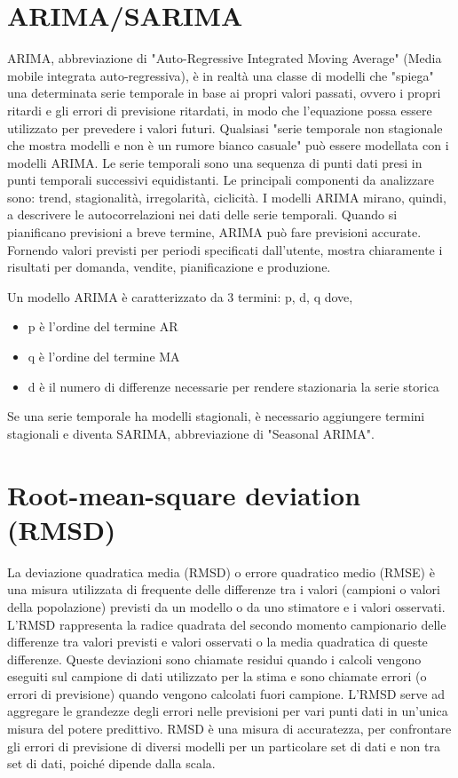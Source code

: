 \documentclass[12pt,a4paper]{report}
\begin{document}
\section*{ARIMA/SARIMA}
\label{appendix:ARIMA}
ARIMA, abbreviazione di "Auto-Regressive Integrated Moving Average" (Media mobile integrata auto-regressiva), è in realtà una classe di modelli che "spiega" una determinata serie temporale in base ai propri valori passati, ovvero i propri ritardi e gli errori di previsione ritardati, in modo che l'equazione possa essere utilizzato per prevedere i valori futuri. Qualsiasi "serie temporale non stagionale che mostra modelli e non è un rumore bianco casuale" può essere modellata con i modelli ARIMA. Le serie temporali sono una sequenza di punti dati presi in punti temporali successivi equidistanti. Le principali componenti da analizzare sono: trend, stagionalità, irregolarità, ciclicità.
I modelli ARIMA mirano, quindi, a descrivere le autocorrelazioni nei dati delle serie temporali. Quando si pianificano previsioni a breve termine, ARIMA può fare previsioni accurate. Fornendo valori previsti per periodi specificati dall'utente, mostra chiaramente i risultati per domanda, vendite, pianificazione e produzione.

Un modello ARIMA è caratterizzato da 3 termini: p, d, q dove,
\begin{itemize}
    \item p è l'ordine del termine AR
    \item q è l'ordine del termine MA
    \item d è il numero di differenze necessarie per rendere stazionaria la serie storica
\end{itemize}

Se una serie temporale ha modelli stagionali, è necessario aggiungere termini stagionali e diventa SARIMA, abbreviazione di "Seasonal ARIMA". 

\section*{Root-mean-square deviation (RMSD)}
\label{appendix:RMSD}
La deviazione quadratica media (RMSD) o errore quadratico medio (RMSE) è una misura utilizzata di frequente delle differenze tra i valori (campioni o valori della popolazione) previsti da un modello o da uno stimatore e i valori osservati. L'RMSD rappresenta la radice quadrata del secondo momento campionario delle differenze tra valori previsti e valori osservati o la media quadratica di queste differenze. Queste deviazioni sono chiamate residui quando i calcoli vengono eseguiti sul campione di dati utilizzato per la stima e sono chiamate errori (o errori di previsione) quando vengono calcolati fuori campione. L'RMSD serve ad aggregare le grandezze degli errori nelle previsioni per vari punti dati in un'unica misura del potere predittivo. RMSD è una misura di accuratezza, per confrontare gli errori di previsione di diversi modelli per un particolare set di dati e non tra set di dati, poiché dipende dalla scala.
\end{document}
